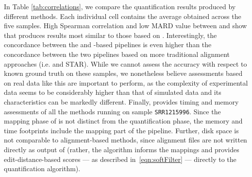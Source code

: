 In Table \ref{tab:correlations}, we compare the quantification results produced by different methods. Each 
individual cell contains the average obtained across the five samples. High Spearman correlation and low MARD 
value between \bt and \sla show that \sla produces results most similar to those based on \bt. Interestingly, 
the concordance between the \sla and \bt-based pipelines is even higher than the concordance between the two 
pipelines based on more traditional alignment approaches (i.e. \bt and STAR). While we cannot assess the accuracy 
with respect to known ground truth on these samples, we nonetheless believe assessments based on real data like 
this are important to perform, as the complexity of experimental data seems to be considerably higher than that 
of simulated data and its characteristics can be markedly different. Finally,  
provides timing and memory assessments of all the methods running on sample \texttt{SRR1215996}. Since the 
mapping phase of \sla is not distinct from the quantification phase, the memory and time footprints include 
the mapping part of the pipeline.  Further, disk space is not comparable to alignment-based methods, since 
alignment files are not written directly as output of \sla (rather, the \sla algorithm informs the mappings 
and provides edit-distance-based scores --- as described in~\cref{eqn:softFilter} --- directly to the 
quantification algorithm).

